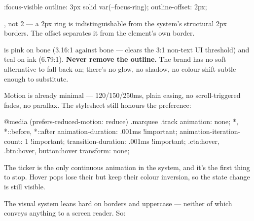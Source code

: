 \documentclass[fontpath=fonts/,logopath=logo/]{riposte-doc}
\begin{document}

\ripcodeopen
{}
\begin{ripcodeblock}
:focus-visible { outline: 3px solid var(--focus-ring); outline-offset: 2px; }
\end{ripcodeblock}
\ripcodesizereset\ripcodeclose

\ripmono{3px}, not 2 — a 2px ring is indistinguishable from the system's structural 2px borders. The \ripmono{2px} offset separates it from the element's own border.

 is pink on bone (3.16:1 against bone — clears the 3:1 non-text UI threshold) and teal on ink (6.79:1). \textbf{Never remove the outline.} The brand has no soft alternative to fall back on; there's no glow, no shadow, no colour shift subtle enough to substitute.



Motion is already minimal — 120/150/250ms, plain easing, no scroll-triggered fades, no parallax. The stylesheet still honours the preference:

\ripcodeopen
{}
\begin{ripcodeblock}
@media (prefers-reduced-motion: reduce) {
  .marquee .track { animation: none; }
  *, *::before, *::after {
    animation-duration: .001ms !important;
    animation-iteration-count: 1 !important;
    transition-duration: .001ms !important;
  }
  .cta:hover, .btn:hover, button:hover { transform: none; }
}
\end{ripcodeblock}
\ripcodesizereset\ripcodeclose

The  ticker is the only continuous animation in the system, and it's the first thing to stop. Hover pops lose their  but keep their colour inversion, so the state change is still visible.



The visual system leans hard on borders and uppercase — neither of which conveys anything to a screen reader. So:
\end{document}
